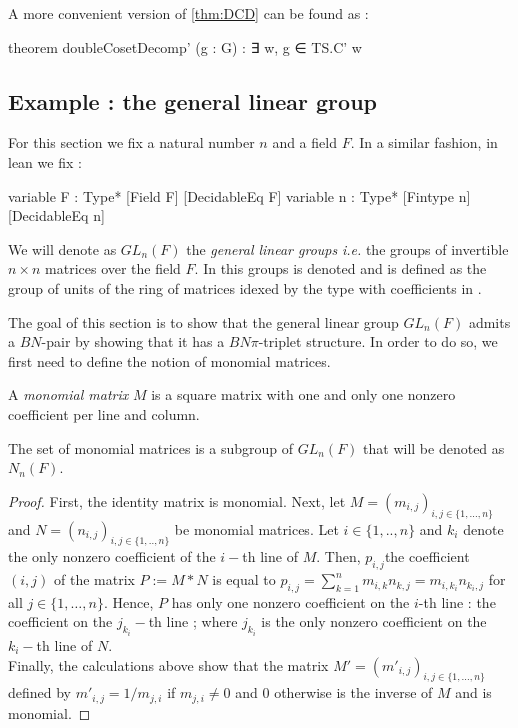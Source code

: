 A more convenient version of \ref{thm:DCD} can be found as :
\begin{leancode}
theorem doubleCosetDecomp' (g : G) : ∃ w, g ∈ TS.C' w 
\end{leancode}



\subsection{Example : the general linear group}
\label{sub:GL}
For this section we fix a natural number $n$ and a field $F$.
In a similar fashion, in lean we fix : 
\begin{leancode}
variable {F : Type*} [Field F] [DecidableEq F] 
variable {n : Type*} [Fintype n] [DecidableEq n] 
\end{leancode}

\begin{notation}
    We will denote as $GL_n(F)$ the \emph{general linear groups} \textit{i.e.} the groups of invertible $n \times n$ matrices over the field $F$. In \Lean this groups is denoted  and is defined as the group of units of the ring  of matrices idexed by the type  with coefficients in .
\end{notation} 

The goal of this section is to show that the general linear group $GL_n\left( F \right)$ admits a $BN$-pair by showing that it has a $BN\pi$-triplet structure. In order to do so, we first need to define the notion of monomial matrices.

\begin{definition}
    A \emph{monomial matrix} $M$ is a square matrix with one and only one nonzero coefficient per line and column.
\end{definition}

\begin{propriete} \label{prop:monomial}
    The set of monomial matrices is a subgroup of $GL_n\left( F \right)$ that will be denoted as $N_n(F)$.
\end{propriete}

\begin{proof}
    First, the identity matrix is monomial. Next, let $M = \left( m_{i,j} \right)_{i,j \in \{1,\ldots,n\}}$ and $N =\left( n_{i,j} \right)_{i,j \in \{1,..,n\}}$ be monomial matrices. Let $i \in \{1,..,n\}$ and $k_i$ denote the only nonzero coefficient of the $i-$th line of $M$. Then, $p_{i,j}$the coefficient $(i,j)$ of the matrix $P:= M*N$ is equal to $p_{i,j} = \sum_{k=1}^{n} m_{i,k}n_{k,j} = m_{i,k_i}n_{k_i, j}$ for all $j \in \{1,\ldots,n\}$. Hence, $P$ has only one nonzero coefficient on the $i$-th line : the coefficient on the $j_{k_i}-$th line ; where $j_{k_i}$ is the only nonzero coefficient on the $k_i-$th line of $N$.\\
    Finally, the calculations above show that the matrix $M' = \left( m'_{i,j} \right)_{i,j \in \{1,\ldots,n\}}$ defined by $m'_{i,j} = 1 /{m_{j,i}}$ if $m_{j,i} \neq 0$ and $0$ otherwise is the inverse of $M$ and is monomial.
\end{proof}

